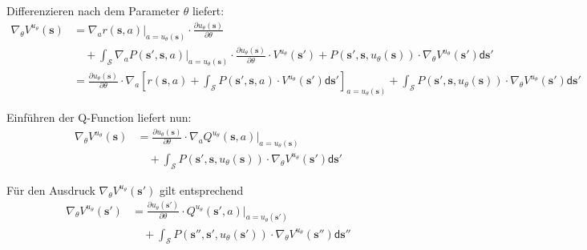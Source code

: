 \documentclass[a4paper, 12pt]{scrartcl}
\begin{document}
\begin{beweis}
    Differenzieren nach dem Parameter $\theta$ liefert:
    \begin{align*}
        \nabla_{\theta} V^{u_\theta}(\bm{s})
        &=
        \nabla_{a} r(\bm{s},a) \Big|_{a = u_\theta (\bm{s})} 
        \cdot 
        \frac{\partial u_\theta (\bm{s})}{\partial \theta}
        \\
        &\quad +
        \int_{\mathcal{S}} 
        \nabla_a P(\bm{s}', \bm{s},a) \Big|_{a = u_\theta (\bm{s})}
        \cdot 
        \frac{\partial u_\theta (\bm{s})}{\partial \theta}
        \cdot 
        V^{u_\theta}(\bm{s}')
        +
        P(\bm{s}', \bm{s}, u_\theta (\bm{s})) 
        \cdot
        \nabla_\theta V^{u_\theta}(\bm{s}')
        \mathsf{d}\bm{s}'
        \\
        &=
        \frac{\partial u_\theta (\bm{s})}{\partial \theta}
        \cdot
        \nabla_a
        \left[
            r(\bm{s},a) 
            + 
            \int_{\mathcal{S}} 
            P(\bm{s}', \bm{s},a) 
            \cdot 
            V^{u_\theta}(\bm{s}')
            \mathsf{d}\bm{s}'
        \right]_{a = u_\theta (\bm{s})}
        +
        \int_{\mathcal{S}} 
        P(\bm{s}', \bm{s}, u_\theta (\bm{s})) 
        \cdot
        \nabla_\theta V^{u_\theta}(\bm{s}')
        \mathsf{d}\bm{s}'
    \end{align*}

    Einführen der Q-Function liefert nun:
    \begin{align*}
        \nabla_{\theta} V^{u_\theta}(\bm{s})
        &=
        \frac{\partial u_\theta (\bm{s})}{\partial \theta}
        \cdot
        \nabla_a Q^{u_{\theta}}(\bm{s} , a) \Big|_{a = u_\theta (\bm{s})}
        \\
        &\quad+
        \int_{\mathcal{S}} 
        P(\bm{s}', \bm{s}, u_\theta (\bm{s})) 
        \cdot
        \nabla_\theta V^{u_\theta}(\bm{s}')
        \mathsf{d}\bm{s}'
    \end{align*}

    Für den Ausdruck $\nabla_\theta V^{u_\theta}(\bm{s}')$ gilt entsprechend
    \begin{align*}
        \nabla_\theta V^{u_\theta}(\bm{s}')
        &=
        \frac{\partial u_\theta (\bm{s}')}{\partial \theta}
        \cdot
        Q^{u_{\theta}}(\bm{s}', a) \Big|_{a = u_\theta (\bm{s}')}
        \\
        &\quad+
        \int_{\mathcal{S}} 
        P(\bm{s}'', \bm{s}', u_\theta (\bm{s}')) 
        \cdot
        \nabla_\theta V^{u_\theta}(\bm{s}'')
        \mathsf{d}\bm{s}''
    \end{align*}


\end{beweis}
\end{document}
